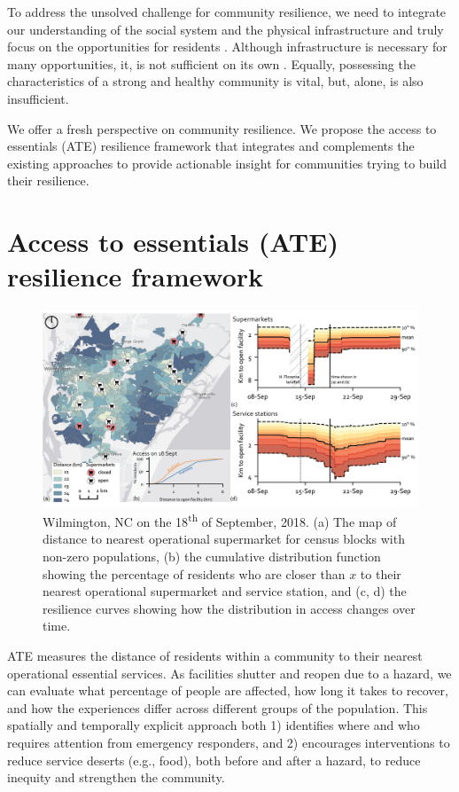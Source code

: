 \documentclass[9pt,twocolumn,twoside,lineno]{pnas-new}
\begin{document}
To address the unsolved challenge for community resilience, we need to integrate our understanding of the social system and the physical infrastructure and truly focus on the opportunities for residents \cite{Koliou2018-jt, Cutter2016-landscape, Folke2010-bz}.
Although infrastructure is necessary for many opportunities, it, is not sufficient on its own \cite{Doorn2018-fx}.
Equally, possessing the characteristics of a strong and healthy community is vital, but, alone, is also insufficient.

We offer a fresh perspective on community resilience.
We propose the access to essentials (ATE) resilience framework that integrates and complements the existing approaches to provide actionable insight for communities trying to build their resilience.

\section*{Access to essentials (ATE) resilience framework}

\begin{figure}
    \centering
    \includegraphics[width=0.8\linewidth]{report/fig/NC_resilience.png}
    \caption{Wilmington, NC on the 18\textsuperscript{th} of September, 2018. (a) The map of distance to nearest operational supermarket for census blocks with non-zero populations, (b) the cumulative distribution function showing the percentage of residents who are closer than $x$ to their nearest operational supermarket and service station, and (c, d) the resilience curves showing how the distribution in access changes over time.
    }
    \label{fig:fig1}
\end{figure}

ATE measures the distance of residents within a community to their nearest operational essential services. 
As facilities shutter and reopen due to a hazard, we can evaluate what percentage of people are affected, how long it takes to recover, and how the experiences differ across different groups of the population. 
This spatially and temporally explicit approach both 1) identifies where and who requires attention from emergency responders, and 2) encourages interventions to reduce service deserts (e.g., food), both before and after a hazard, to reduce inequity and strengthen the community.
\end{document}

